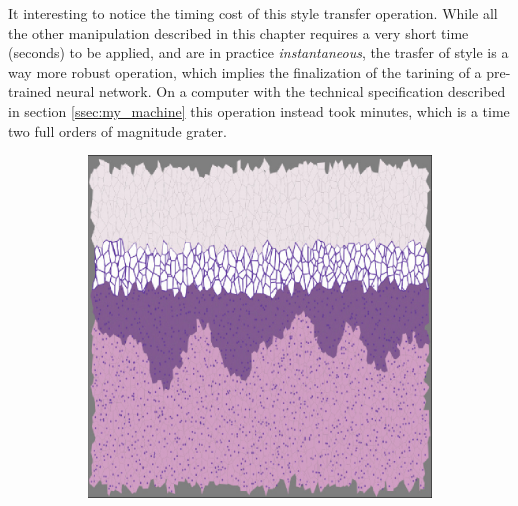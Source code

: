 \begin{description}
        It interesting to notice the timing cost of this style transfer operation. While all the other manipulation described in this chapter requires a very short time (seconds) to be applied, and are in practice \textit{instantaneous}, the trasfer of style is a way more robust operation, which implies the finalization of the tarining of a pre-trained neural network. On a computer with the technical specification described in section \ref{ssec:my_machine} this operation instead took minutes, which is a time two full orders of magnitude grater.

        \begin{figure}
            \centering
            \begin{subfigure}[t]{0.3\textwidth}
                 \centering
                 \includegraphics[width = \textwidth]{images/st_nn4}
                 \caption{}
                 \label{fig:st_nn4}
            \end{subfigure}
            \quad
            \begin{subfigure}[t]{0.3\textwidth}
                 \centering

\end{subfigure}
\end{figure}
\end{description}
